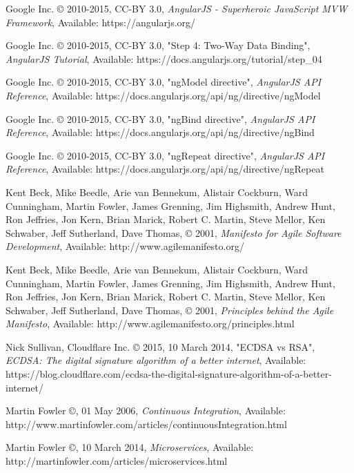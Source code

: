 \begin{thebibliography}{999}
\raggedright
Google Inc. © 2010-2015, CC-BY 3.0,
{\em AngularJS - Superheroic JavaScript MVW Framework},
Available: https://angularjs.org/

\raggedright
Google Inc. © 2010-2015, CC-BY 3.0, "Step 4: Two-Way Data Binding",
{\em AngularJS Tutorial},
Available: https://docs.angularjs.org/tutorial/step\_04

\raggedright
Google Inc. © 2010-2015, CC-BY 3.0, "ngModel directive",
{\em AngularJS API Reference},
Available: https://docs.angularjs.org/api/ng/directive/ngModel

\raggedright
Google Inc. © 2010-2015, CC-BY 3.0, "ngBind directive",
{\em AngularJS API Reference},
Available: https://docs.angularjs.org/api/ng/directive/ngBind

\raggedright
Google Inc. © 2010-2015, CC-BY 3.0, "ngRepeat directive",
{\em AngularJS API Reference},
Available: https://docs.angularjs.org/api/ng/directive/ngRepeat

\raggedright
Kent Beck, Mike Beedle, Arie van Bennekum, Alistair Cockburn, Ward Cunningham,
Martin Fowler, James Grenning, Jim Highsmith, Andrew Hunt, Ron Jeffries, Jon
Kern, Brian Marick, Robert C. Martin, Steve Mellor, Ken Schwaber, Jeff
Sutherland, Dave Thomas, © 2001,
{\em Manifesto for Agile Software Development},
Available: http://www.agilemanifesto.org/

\raggedright
Kent Beck, Mike Beedle, Arie van Bennekum, Alistair Cockburn, Ward Cunningham,
Martin Fowler, James Grenning, Jim Highsmith, Andrew Hunt, Ron Jeffries, Jon
Kern, Brian Marick, Robert C. Martin, Steve Mellor, Ken Schwaber, Jeff
Sutherland, Dave Thomas, © 2001,
{\em Principles behind the Agile Manifesto},
Available: http://www.agilemanifesto.org/principles.html

\raggedright
Nick Sullivan, Cloudflare Inc. © 2015, 10 March 2014, "ECDSA vs RSA",
{\em ECDSA: The digital signature algorithm of a better internet},
Available: https://blog.cloudflare.com/ecdsa-the-digital-signature-algorithm-of-a-better-internet/

\raggedright
Martin Fowler ©, 01 May 2006,
{\em Continuous Integration},
Available: http://www.martinfowler.com/articles/continuousIntegration.html

\raggedright
Martin Fowler ©, 10 March 2014,
{\em Microservices},
Available: http://martinfowler.com/articles/microservices.html


\end{thebibliography}
